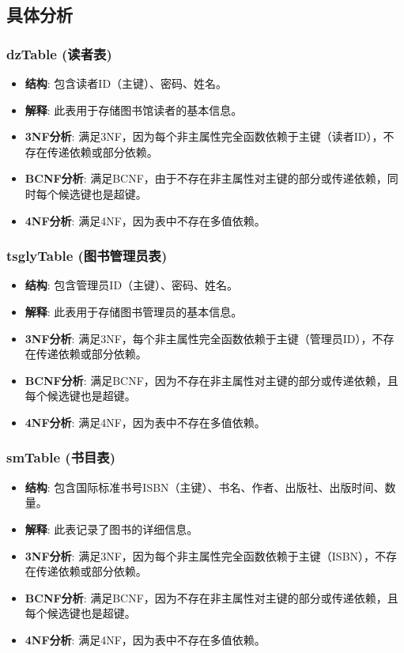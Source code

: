 \documentclass{ctexart}
\begin{document}
		\subsection{具体分析}

		\subsubsection{dzTable (读者表)}
\begin{itemize}
    \item \textbf{结构}: 包含读者ID（主键）、密码、姓名。
    \item \textbf{解释}: 此表用于存储图书馆读者的基本信息。
    \item \textbf{3NF分析}: 满足3NF，因为每个非主属性完全函数依赖于主键（读者ID），不存在传递依赖或部分依赖。
    \item \textbf{BCNF分析}: 满足BCNF，由于不存在非主属性对主键的部分或传递依赖，同时每个候选键也是超键。
    \item \textbf{4NF分析}: 满足4NF，因为表中不存在多值依赖。
\end{itemize}

\subsubsection{tsglyTable (图书管理员表)}
\begin{itemize}
    \item \textbf{结构}: 包含管理员ID（主键）、密码、姓名。
    \item \textbf{解释}: 此表用于存储图书管理员的基本信息。
    \item \textbf{3NF分析}: 满足3NF，每个非主属性完全函数依赖于主键（管理员ID），不存在传递依赖或部分依赖。
    \item \textbf{BCNF分析}: 满足BCNF，因为不存在非主属性对主键的部分或传递依赖，且每个候选键也是超键。
    \item \textbf{4NF分析}: 满足4NF，因为表中不存在多值依赖。
\end{itemize}

\subsubsection{smTable (书目表)}
\begin{itemize}
    \item \textbf{结构}: 包含国际标准书号ISBN（主键）、书名、作者、出版社、出版时间、数量。
    \item \textbf{解释}: 此表记录了图书的详细信息。
    \item \textbf{3NF分析}: 满足3NF，因为每个非主属性完全函数依赖于主键（ISBN），不存在传递依赖或部分依赖。
    \item \textbf{BCNF分析}: 满足BCNF，因为不存在非主属性对主键的部分或传递依赖，且每个候选键也是超键。
    \item \textbf{4NF分析}: 满足4NF，因为表中不存在多值依赖。
\end{itemize}
\end{document}
